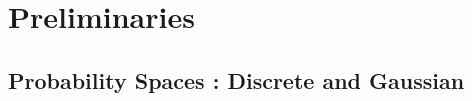 \documentclass[11pt]{article}
\begin{document}
%
%
%

\section{Preliminaries} \label{sec:prelim}

\subsection{Probability Spaces : Discrete and Gaussian}
\end{document}
